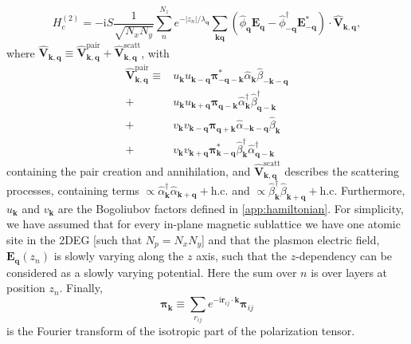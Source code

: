 \documentclass[aps,prb,reprint,twocolumns,superscriptaddress,nofootinbib]{revtex4-2}
\newcommand{\hc}{\text{h.c.}}
\newcommand{\ii}{\mathrm{i}}
\begin{document}
	\begin{equation}
		H_c^{(2)}=-\ii S {\frac{1}{\sqrt{N_x N_y}}}\sum_n^{N_z}e^{- |z_n|/\lambda_{\bm q}} \sum_{\bm k\bm q}(\hat\phi_{\bm q}\bm E_{\bm q} - \hat\phi^\dagger_{-\bm q}\bm E_{-\bm q}^*)\cdot \hat{ \bm V}_{\bm k,\bm q}, \label{eq:Hc-AFM-final}
	\end{equation}
	where $\hat{\bm V}_{\bm k,\bm q}\equiv \hat{\bm V}_{\bm k,\bm q}^{\mathrm{pair}}+\hat{\bm V}_{\bm k,\bm q}^{\mathrm{scatt}}$, with
	\begin{align}
		\hat{\bm V}_{\bm k,\bm q}^{\mathrm{pair}} \equiv &u_{\bm k}u_{\bm k-\bm q} \bm\pi_{-\bm q-\bm k}^*\hat\alpha_{\bm k}\hat\beta_{-\bm k - \bm q}  \nonumber\\
		+ &u_{\bm k}u_{\bm k+\bm q} \bm\pi_{\bm q- \bm k} \hat\alpha_{\bm k}^\dagger \hat\beta_{\bm q-\bm k}^\dagger \nonumber\\ 
		+  
		&v_{\bm k}v_{\bm k-\bm q}\bm\pi_{\bm q+\bm k} \hat\alpha_{-\bm k-\bm q}\hat\beta_{\bm k} \nonumber\\
		+&v_{\bm k}v_{\bm k+\bm q}\bm\pi_{\bm k-\bm q}^* \hat\beta_{\bm k}^\dagger \hat\alpha_{\bm q-\bm k}^\dagger 
	\end{align}
	containing the pair creation and annihilation, and $\hat{\bm V}_{\bm k,\bm q}^{\mathrm{scatt}}$ describes the scattering processes, containing terms $\propto \hat\alpha_{\bm k}^\dagger\hat\alpha_{\bm k + \bm q}+\hc$ and $\propto \hat\beta_{\bm k}^\dagger\hat\beta_{\bm k + \bm q}+\hc$ Furthermore, $u_{\bm k}$ and $v_{\bm k}$ are the Bogoliubov factors defined in \cref{app:hamiltonian}.
	For simplicity, we have assumed that for every in-plane magnetic sublattice we have one atomic site in the 2DEG [such that $N_p=N_xN_y$]
	and that the plasmon electric field, $\bm E_{\bm q}(z_n)$ is slowly varying along the $z$ axis, such that the $z$-dependency can be considered as a slowly varying potential. Here the sum over $n$ is over layers at position $z_n$.
	Finally,
	\begin{equation}
		\bm \pi_{\bm k} \equiv \sum_{r_{ij}} e^{-\ii\bm r_{ij} \cdot \bm k} \bm \pi_{ij}
	\end{equation}
	is the Fourier transform of the isotropic part of the polarization tensor. 
	
\end{document}

